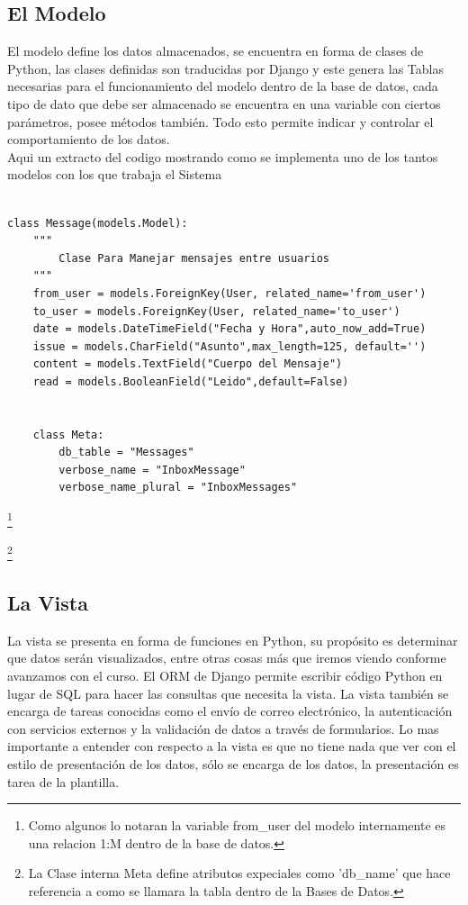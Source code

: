\subsection{El Modelo}
El modelo define los datos almacenados, se encuentra en forma de clases de
Python, las clases definidas son traducidas por Django y este genera las Tablas
necesarias para el funcionamiento del modelo dentro de la base de datos, cada
tipo de dato que debe ser almacenado se encuentra en una variable 
con ciertos parámetros, posee métodos también. Todo esto permite indicar y
controlar el comportamiento de los datos.\\[0.1cm]

Aqui un extracto del codigo mostrando como se implementa uno de los tantos
modelos con los que trabaja el Sistema\\[0.3cm]


\begin{lstlisting}[style=Python]

class Message(models.Model):
    """
        Clase Para Manejar mensajes entre usuarios
    """
    from_user = models.ForeignKey(User, related_name='from_user')
    to_user = models.ForeignKey(User, related_name='to_user')
    date = models.DateTimeField("Fecha y Hora",auto_now_add=True)
    issue = models.CharField("Asunto",max_length=125, default='')
    content = models.TextField("Cuerpo del Mensaje")
    read = models.BooleanField("Leido",default=False)


    class Meta:
        db_table = "Messages"
        verbose_name = "InboxMessage"
        verbose_name_plural = "InboxMessages"
\end{lstlisting}

\footnote{Como algunos lo notaran la variable from\_user del modelo internamente
es una relacion 1:M dentro de la base de datos.}

\footnote{La Clase interna Meta define atributos expeciales como 'db\_name' que hace
referencia a como se llamara la tabla dentro de la Bases de Datos.}

\vspace{0.1cm}

\subsection{La Vista}
La vista se presenta en forma de funciones en Python, su propósito es
determinar que datos serán visualizados, entre otras cosas más que iremos
viendo conforme avanzamos con el curso. El ORM de Django permite escribir
código Python en lugar de SQL para hacer las consultas que necesita la vista.
La vista también se encarga de tareas conocidas como el envío de correo
electrónico, la autenticación con servicios externos y la validación de
datos a través de formularios. Lo mas importante a entender con respecto a la
 vista es que no tiene nada que ver con el estilo de presentación de los
 datos, sólo se encarga de los datos, la presentación es tarea de la plantilla.\\[0.1cm]



